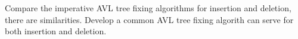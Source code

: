 \documentclass[b5paper]{article}
\begin{document}
\begin{Exercise}
Compare the imperative AVL tree fixing algorithms for insertion and deletion, there are similarities. Develop a common AVL tree fixing algorith can serve for both insertion and deletion.
\end{Exercise}

\ifx\wholebook\relax \else


\end{document}
